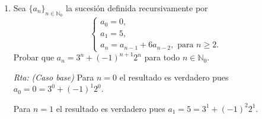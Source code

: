 \documentclass[a4paper,12pt,twoside,spanish,reqno]{amsbook}
\numberwithin{equation}{section}
\newcommand{\rta}{\noindent\textit{Rta: }}
\begin{document}
\begin{enumerate}[resume]
            {\it (Paso  inductivo) } Supongamos que $k \ge 2$ y el resultado  es cierto para los $h$ tales que  $1 \le h \le k$. Es decir que $a_h = h!$ para $1 \le h \le k$ (hipótesis inductiva), entonces debemos probar que $a_{k+1} = (k+1)!$. Ahora bien, 
            \begin{equation*}
            \begin{matrix}\qquad\qquad
            a_{k+1} &=& (k+1-2)a_{k+1-1}+2(k+1-1)a_{n-2}  \hfill &\quad \text{(por definición recursiva)} \hfill \\[4pt]
            &=&  3a_{k}+k(k-2)a_{k-1}   \hfill &\hfill\\[4pt]
            &=&  3k!+k(k-2)(k-1)!  \hfill &\quad \text{(por hipótesis inductiva})\hfill \\[4pt]
            &=&  3k!+(k-2)k! \hfill  & \hfill\\[4pt]
            &=&  (3 + k-2)k! \hfill  & \hfill\\[4pt]
            &=&  ( k+1)k! \hfill  & \hfill\\[4pt]
            &=&  (k+1)! \hfill  & \hfill\\
            \end{matrix}
            \end{equation*}

          
            \item   Sea $\{a_n\}_{n\in\mathbb N_0}$ la sucesión definida recursivamente por
            $$\begin{cases}
               a_0=0, \\a_1=5, \\a_{n} = a_{n-1}+6a_{n-2}, \text{ para $n\geq 2$}.
              \end{cases}$$
            Probar que $a_n=3^n + (-1)^{n+1}2^n$ para todo $n\in \mathbb N_0$.

            \rta \textit{(Caso  base) } Para $n=0$ el resultado es verdadero pues $a_0 = 0 = 3^0 + (-1)^1 2^0$.
        
            Para $n=1$ el resultado es verdadero pues $a_1 = 5 = 3^1 + (-1)^2 2^1$.
            

\end{enumerate}
\end{document}
